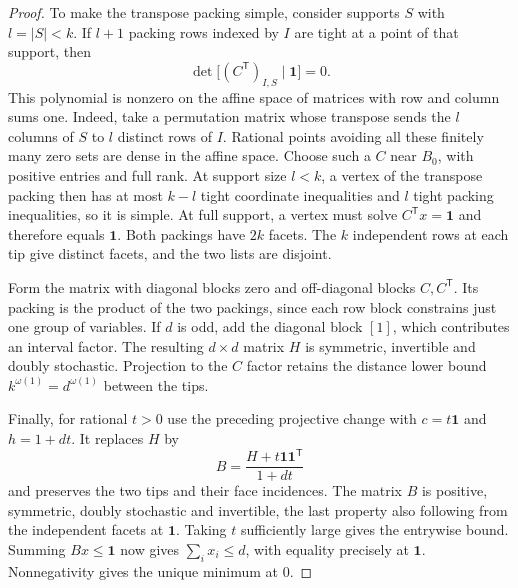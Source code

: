 \begin{proof}
To make the transpose packing simple, consider supports $S$ with
$l=|S|<k$. If $l+1$ packing rows indexed by $I$ are tight at a
point of that support, then
\[
                  \det\bigl[(C^{\mathsf T})_{I,S}\mid\mathbf1\bigr]=0 .
\]
This polynomial is nonzero on the affine space of matrices with row
and column sums one. Indeed, take a permutation matrix whose transpose sends
the $l$ columns of $S$ to $l$ distinct rows of $I$. Rational points
avoiding all these finitely many zero sets are dense in the affine
space. Choose such a $C$ near $B_0$, with positive entries and full
rank. At support size $l<k$, a vertex of the transpose packing then
has at most $k-l$ tight coordinate inequalities and $l$ tight packing
inequalities, so it is simple. At full support, a vertex must solve
$C^{\mathsf T}x=\mathbf1$ and therefore equals $\mathbf1$. Both
packings have $2k$ facets. The $k$ independent rows at each tip give
distinct facets, and the two lists are disjoint.

Form the matrix with diagonal blocks zero and off-diagonal blocks
$C,C^{\mathsf T}$. Its packing is the product of the two packings,
since each row block constrains just one group of variables. If $d$
is odd, add the diagonal block $[1]$, which contributes an interval
factor. The resulting $d\times d$ matrix $H$ is symmetric, invertible
and doubly stochastic. Projection to the $C$ factor retains the
distance lower bound $k^{\omega(1)}=d^{\omega(1)}$ between the tips.

Finally, for rational $t>0$ use the preceding projective change with
$c=t\mathbf1$ and $h=1+dt$. It replaces $H$ by
\[
                 B=\frac{H+t\mathbf1\mathbf1^{\mathsf T}}{1+dt}
\]
and preserves the two tips and their face incidences. The matrix $B$
is positive, symmetric, doubly stochastic and invertible, the last
property also following from the independent facets at $\mathbf1$.
Taking $t$ sufficiently large gives the entrywise bound. Summing
$Bx\le\mathbf1$ now gives $\sum_i x_i\le d$, with equality precisely
at $\mathbf1$. Nonnegativity gives the unique minimum at $0$.
\end{proof}
